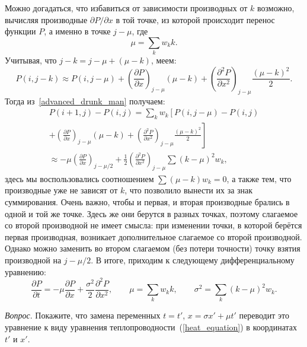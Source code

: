\documentclass{book}
\begin{document}
Можно догадаться, что избавиться от зависимости производных от $k$ возможно, вычисляя производные
$\partial P / \partial x$ в той точке, из которой происходит перенос функции $P$, а именно в точке
$j - \mu$, где
\begin{equation}
    \mu = \sum_k w_k k.
\end{equation}
Учитывая, что $j - k = j - \mu + (\mu - k)$, меем:
\begin{equation}
    P(i, j - k) \approx P(i, j - \mu) + \left( \frac{\partial P}{\partial x} \right)_{j - \mu} (\mu
    - k) + \left( \frac{\partial^2 P}{\partial x^2} \right)_{j - \mu} \frac{(\mu - k)^2}{2}.
\end{equation}
Тогда из~\ref{advanced_drunk_man} получаем:
\begin{multline}
    P(i + 1, j) - P(i, j) = \sum_k w_k \left[ P(i, j - \mu) - P(i, j) \right. \\
    \left. + \left( \frac{\partial P}{\partial x} \right)_{j - \mu} (\mu - k) + \left(
    \frac{\partial^2 P}{\partial x^2} \right)_{j - \mu} \frac{(\mu - k)^2}{2} \right] \\
    \approx -\mu \left( \frac{\partial P}{\partial x} \right)_{j - \mu/2} + \frac{1}{2} \left(
    \frac{\partial^2 P}{\partial x^2} \right)_{j - \mu} \sum (k - \mu)^2 w_k,
\end{multline}
здесь мы воспользовались соотношением $\sum (\mu - k) w_k = 0$, а также тем, что производные уже не
зависят от $k$, что позволило вынести их за знак суммирования. Очень важно, чтобы и первая, и
вторая производные брались в одной и той же точке. Здесь же они берутся в разных точках, поэтому
слагаемое со второй производной не имеет смысла: при изменении точки, в которой берётся первая
производная, возникает дополнительное слагаемое со второй производной. Однако можно заменить во
втором слагаемом (без потери точности) точку взятия производной на $j - \mu/2$. В итоге, приходим к
следующему дифференциальному уравнению:
\begin{equation}
    \label{heat_equation_mu_sigma}
    \frac{\partial P}{\partial t} = -\mu \frac{\partial P}{\partial x} + \frac{\sigma^2}{2}
    \frac{\partial^2 P}{\partial x^2}, \qquad \mu = \sum_k w_k k, \qquad \sigma^2 = \sum_k  (k -
    \mu)^2 w_k.
\end{equation}

\textit{Вопрос}. Покажите, что замена переменных $t = t'$, $x = \sigma x' + \mu t'$ переводит это
уравнение к виду уравнения теплопроводности~(\ref{heat_equation}) в координатах $t'$ и $x'$.
\end{document}
